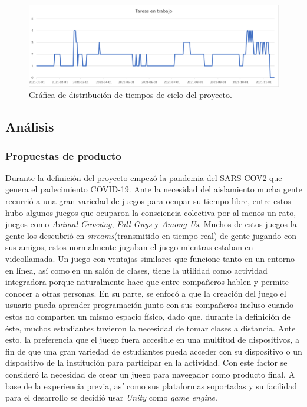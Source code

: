 \begin{figure}[H]
    \centering
    \includegraphics[width=0.8\linewidth]{images/TareasEnTrabajo.png}
    \caption{Gráfica de distribución de tiempos de ciclo del proyecto.}
    \label{fig:grafica_tiempos_ciclo}
\end{figure}

\subsection{Análisis}
\subsubsection{Propuestas de producto}
Durante la definición del proyecto empezó la pandemia del SARS-COV2 que genera el padecimiento COVID-19. Ante la necesidad del aislamiento mucha gente recurrió a una gran variedad de juegos para ocupar su tiempo libre, entre estos hubo algunos juegos que ocuparon la consciencia colectiva por al menos un rato, juegos como \textit{Animal Crossing}, \textit{Fall Guys} y \textit{Among Us}. Muchos de estos juegos la gente los descubrió en \textit{streams}(transmitido en tiempo real) de gente jugando con sus amigos, estos normalmente jugaban el juego mientras estaban en videollamada. Un juego con ventajas similares que funcione tanto en un entorno en línea, así como en un salón de clases, tiene la utilidad como actividad integradora porque naturalmente hace que entre compañeros hablen y permite conocer a otras personas.
En su parte, se enfocó a que la creación del juego el usuario pueda aprender programación junto con sus compañeros incluso cuando estos no comparten un mismo espacio físico, dado que, durante la definición de éste, muchos estudiantes tuvieron la necesidad de tomar clases a distancia. Ante esto, la preferencia que el juego fuera accesible en una multitud de dispositivos, a fin de que una gran variedad de estudiantes pueda acceder con su dispositivo o un dispositivo de la institución para participar en la actividad. Con este factor se consideró la necesidad de crear un juego para navegador como producto final. A base de la experiencia previa, así como sus plataformas soportadas y su facilidad para el desarrollo se decidió usar \textit{Unity} como \textit{game engine}.

